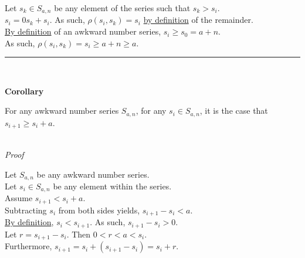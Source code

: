 \documentclass[a4paper,12pt]{article}
\begin{document}
\noindent Let $s_k \in S_{a, n}$ be any element of the series such that $s_k > s_i$.\\

\noindent $s_i = 0s_k + s_i$. As such, $\rho(s_i, s_k) = s_i$ \hyperlink{theorem:remainder_theorem}{by definition} of the remainder.\\

\noindent \hyperlink{definition:awkward_number_series}{By definition} of an awkward number series, $s_i \geq s_0 = a + n$.\\

\noindent As such, $\rho(s_i, s_k) = s_i \geq a + n \geq a$.

\begin{center}
\noindent\rule{8cm}{0.4pt}
\end{center}
\noindent \\






\label{corollary:non_divisibility_of_elements}
\hypertarget{corollary:non_divisibility_of_elements}{}
\begin{tcolorbox}
\textbf{Corollary}

For any awkward number series $S_{a, n}$, for any $s_i \in S_{a, n}$, it is the case that $s_{i + 1} \geq s_i + a$.
\end{tcolorbox}

\noindent \\
\textit{Proof}

\noindent Let $S_{a, n}$ be any awkward number series.\\

\noindent Let $s_i \in S_{a, n}$ be any element within the series.\\

\noindent Assume $s_{i + 1} < s_i + a$.\\

\noindent Subtracting $s_i$ from both sides yields, $s_{i + 1} - s_i < a$.\\

\noindent \hyperlink{definition:awkward_number_series}{By definition}, $s_i < s_{i + 1}$. As such, $s_{i + 1} - s_i > 0$.\\

\noindent Let $r = s_{i + 1} - s_i$. Then $0 < r < a < s_i$.\\

\noindent Furthermore, $s_{i + 1} = s_i + (s_{i + 1} - s_i) = s_i + r$.\\
\end{document}
